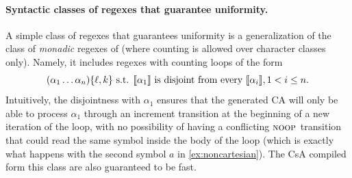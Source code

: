 \documentclass[acmsmall,screen]{acmart}
\begin{document}
\paragraph{Syntactic classes of regexes that guarantee uniformity.}
A simple class of regexes that guarantees uniformity is a generalization of the class of \emph{monadic} regexes of \cite{aplas19} (where
counting is allowed over character classes only).
%
Namely, it includes regexes with counting loops of the form
$$
\text{$(\alpha_1\ldots\alpha_n)\{\ell,k\}$ s.t. $\llbracket\alpha_1\rrbracket$ is disjoint from
every $\llbracket\alpha_i\rrbracket,1<i\leq n$.} 
$$
%
Intuitively, the disjointness with $\alpha_1$ ensures that the generated CA will
only be able to process $\alpha_1$ through an increment transition at the
beginning of a new iteration of the loop, with no possibility of having a
conflicting $\textsc{noop}_{{}}$ transition that could read the same symbol inside the body
of the loop (which is exactly what happens with the second symbol $a$ in
\cref{ex:noncartesian}). The CsA compiled form this class are also guaranteed to be fast.

\end{document}
